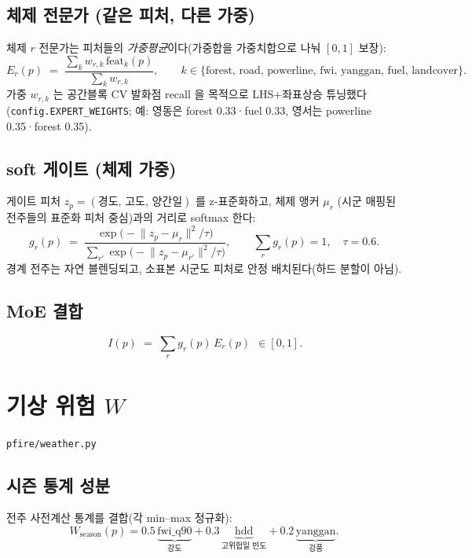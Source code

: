 \documentclass[11pt,a4paper]{article}
\newcommand{\src}[1]{{\footnotesize\color{gray}\texttt{#1}}}
\begin{document}
\subsection{체제 전문가 (같은 피처, 다른 가중)}
체제 $r$ 전문가는 피처들의 \emph{가중평균}이다(가중합을 가중치합으로 나눠 $[0,1]$ 보장):
\begin{equation}
E_r(p)\;=\;\frac{\sum_{k} w_{r,k}\,\mathrm{feat}_k(p)}{\sum_{k} w_{r,k}},\qquad
k\in\{\text{forest, road, powerline, fwi, yanggan, fuel, landcover}\}.
\end{equation}
가중 $w_{r,k}$ 는 공간블록 CV 발화점 recall 을 목적으로 LHS+좌표상승 튜닝했다
(\src{config.EXPERT\_WEIGHTS}; 예: 영동은 forest 0.33·fuel 0.33, 영서는
powerline 0.35·forest 0.35).

\subsection{soft 게이트 (체제 가중)}
게이트 피처 $z_p=(\text{경도, 고도, 양간일})$ 를 z-표준화하고, 체제 앵커 $\mu_r$
(시군 매핑된 전주들의 표준화 피처 중심)과의 거리로 softmax 한다:
\begin{equation}
g_r(p)\;=\;\frac{\exp\!\big(-\lVert z_p-\mu_r\rVert^2/\tau\big)}
{\sum_{r'}\exp\!\big(-\lVert z_p-\mu_{r'}\rVert^2/\tau\big)},
\qquad \textstyle\sum_r g_r(p)=1,\quad \tau=0.6.
\end{equation}
경계 전주는 자연 블렌딩되고, 소표본 시군도 피처로 안정 배치된다(하드 분할이 아님).

\subsection{MoE 결합}
\begin{equation}
\boxed{\,I(p)\;=\;\sum_{r} g_r(p)\,E_r(p)\,}\;\in[0,1].
\end{equation}

\section{기상 위험 $W$}
\src{pfire/weather.py}

\subsection{시즌 통계 성분}
전주 사전계산 통계를 결합(각 min--max 정규화):
\begin{equation}
W_{\text{season}}(p)=0.5\,\underbrace{\mathrm{fwi\_q90}}_{\text{강도}}
+0.3\,\underbrace{\mathrm{hdd}}_{\text{고위험일 빈도}}
+0.2\,\underbrace{\mathrm{yanggan}}_{\text{강풍}}.
\end{equation}
\end{document}
